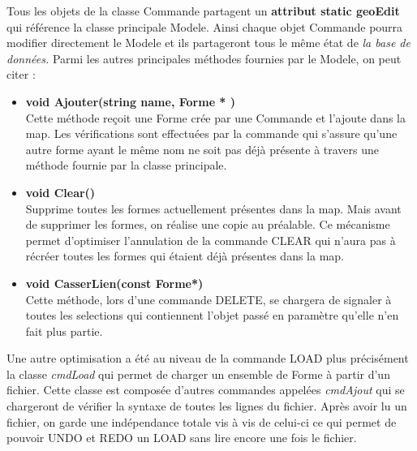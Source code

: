 \documentclass[12pt]{article}
\begin{document}
Tous les objets de la classe Commande partagent un \textbf{attribut static geoEdit} qui référence la classe principale Modele. Ainsi chaque objet Commande pourra modifier directement le Modele et ils partageront tous le même état de \textit{ la base de données.} Parmi les autres principales méthodes fournies par le Modele, on peut citer :
\newline
\begin{itemize}
\item \textbf{void Ajouter(string name, Forme * )}\\
Cette méthode reçoit une Forme crée par une Commande et l’ajoute dans la map. Les vérifications sont effectuées par la commande qui s’assure qu’une autre forme ayant le même nom ne soit pas déjà présente à travers une méthode fournie par la classe principale.

\item \textbf{void Clear()}\\
Supprime toutes les formes actuellement présentes dans la map. Mais avant de supprimer les formes, on réalise une copie au préalable. Ce mécanisme permet d’optimiser l’annulation de la commande CLEAR qui n’aura pas à récréer toutes les formes qui étaient déjà présentes dans la map.

\item \textbf{void CasserLien(const Forme*)}\\
Cette méthode, lors d'une commande DELETE, se chargera de signaler à toutes les selections qui contiennent l'objet passé en paramètre qu'elle n'en fait plus partie.

\end{itemize}
Une autre optimisation a été au niveau de la commande LOAD plus précisément la classe \textit{ cmdLoad} qui permet de charger un ensemble de Forme à partir d'un fichier. Cette classe est composée d'autres commandes appelées \textit{cmdAjout} qui se chargeront de vérifier la syntaxe de toutes les lignes du fichier. Après avoir lu un fichier, on garde une indépendance totale vis à vis de celui-ci ce qui permet de pouvoir UNDO et REDO un LOAD sans lire encore une fois le fichier.
\end{document}
